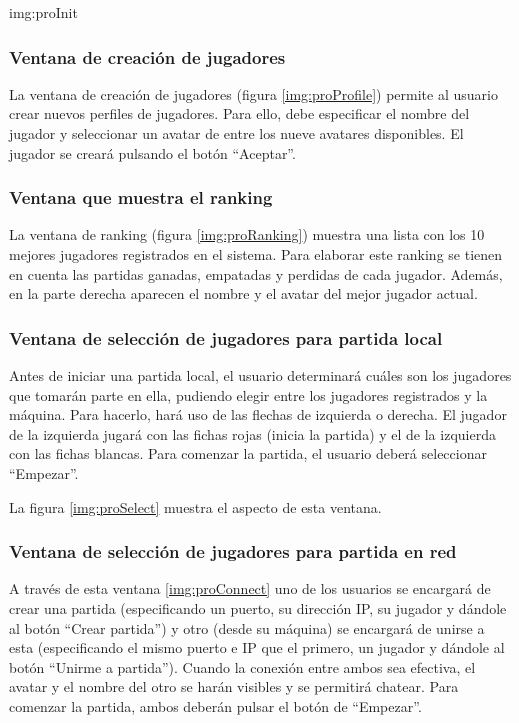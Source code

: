 {img:proInit}

\subsubsection{Ventana de creación de jugadores}
La ventana de creación de jugadores (figura \ref{img:proProfile}) permite al
usuario crear nuevos perfiles de jugadores. Para ello, debe especificar el
nombre del jugador y seleccionar un avatar de entre los nueve avatares
disponibles. El jugador se creará pulsando el botón ``Aceptar''.


\subsubsection{Ventana que muestra el ranking}
La ventana de ranking (figura \ref{img:proRanking}) muestra una lista con los
10 mejores jugadores registrados en el sistema. Para elaborar este ranking se
tienen en cuenta las partidas ganadas, empatadas y perdidas de cada jugador. 
Además, en la parte derecha aparecen el nombre y el avatar del mejor jugador 
actual.


\subsubsection{Ventana de selección de jugadores para partida local}
Antes de iniciar una partida local, el usuario determinará cuáles son los 
jugadores que tomarán parte en ella, pudiendo elegir entre los jugadores 
registrados y la máquina. Para hacerlo, hará uso de las flechas de izquierda o 
derecha. El jugador de la izquierda jugará con las fichas rojas (inicia la 
partida) y el de la izquierda con las fichas blancas. Para comenzar la
partida, el usuario deberá seleccionar ``Empezar''.

La figura \ref{img:proSelect} muestra el aspecto de esta ventana.


\subsubsection{Ventana de selección de jugadores para partida en red}
A través de esta ventana \ref{img:proConnect} uno de los usuarios se encargará
de crear una partida (especificando un puerto, su dirección IP, su jugador y
dándole al botón ``Crear partida'') y otro (desde su máquina) se encargará de 
unirse a esta (especificando el mismo puerto e IP que el primero, un jugador y 
dándole al botón ``Unirme a partida''). Cuando la conexión entre ambos sea 
efectiva, el avatar y el nombre del otro se harán visibles y se permitirá
chatear. Para comenzar la partida, ambos deberán pulsar el botón de
``Empezar''.

